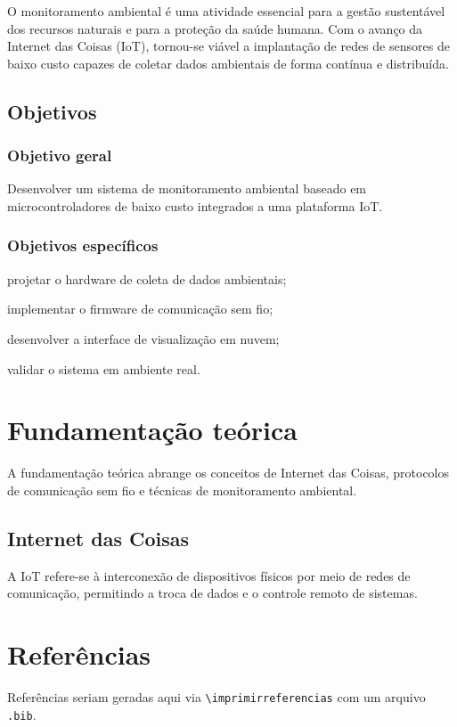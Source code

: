 \documentclass{abnt-unb-A}
\begin{document}
O monitoramento ambiental é uma atividade essencial para a gestão
sustentável dos recursos naturais e para a proteção da saúde humana.
Com o avanço da Internet das Coisas (IoT), tornou-se viável a
implantação de redes de sensores de baixo custo capazes de coletar
dados ambientais de forma contínua e distribuída.

\section{Objetivos}

\subsection{Objetivo geral}

Desenvolver um sistema de monitoramento ambiental baseado em
microcontroladores de baixo custo integrados a uma plataforma IoT.

\subsection{Objetivos específicos}

\begin{alineas}
  \item projetar o hardware de coleta de dados ambientais;
  \item implementar o firmware de comunicação sem fio;
  \item desenvolver a interface de visualização em nuvem;
  \item validar o sistema em ambiente real.
\end{alineas}

\chapter{Fundamentação teórica}

A fundamentação teórica abrange os conceitos de Internet das Coisas,
protocolos de comunicação sem fio e técnicas de monitoramento ambiental.

\section{Internet das Coisas}

A IoT refere-se à interconexão de dispositivos físicos por meio de
redes de comunicação, permitindo a troca de dados e o controle remoto
de sistemas.

\postextual

\chapter*{Referências}

{\singlespacing
Referências seriam geradas aqui via \texttt{\textbackslash imprimirreferencias}
com um arquivo \texttt{.bib}.}
\end{document}
